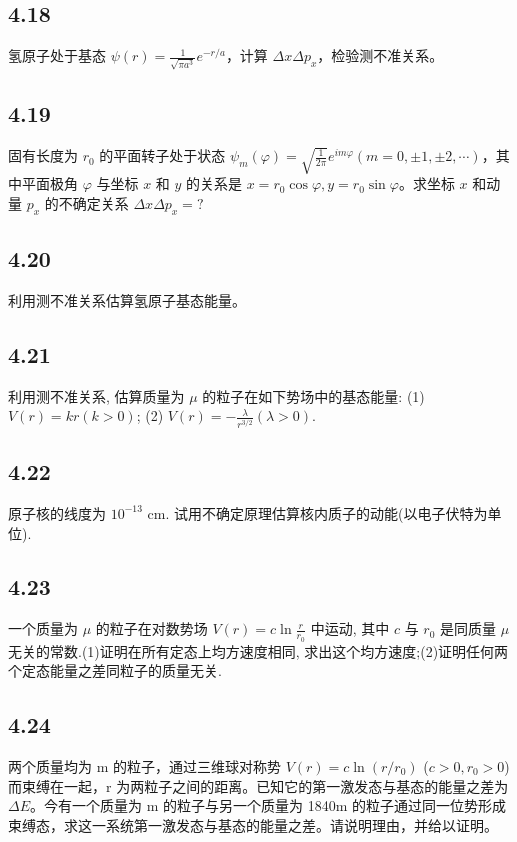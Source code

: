 \subsection{4.18}
氢原子处于基态 $\psi(r) = \frac{1}{\sqrt{\pi a^3}} e^{-r/a}$，计算 $\Delta x \Delta p_x$，检验测不准关系。

\subsection{4.19}
固有长度为 $r_0$ 的平面转子处于状态 $\psi_m(\varphi) = \sqrt{\frac{1}{2\pi}} e^{im\varphi} (m = 0, \pm 1, \pm 2, \cdots)$，其中平面极角 $\varphi$ 与坐标 $x$ 和 $y$ 的关系是 $x = r_0 \cos \varphi,  y = r_0 \sin \varphi$。求坐标 $x$ 和动量 $p_x$ 的不确定关系 $\Delta x \Delta p_x = ?$

\subsection{4.20}
利用测不准关系估算氢原子基态能量。

\subsection{4.21}
利用测不准关系, 估算质量为 $\mu$ 的粒子在如下势场中的基态能量:
(1) $V(r) = kr(k > 0)$; (2) $V(r) = -\frac{\lambda}{r^{3/2}} (\lambda > 0)$.

\subsection{4.22}
原子核的线度为 $10^{-13}$ cm. 试用不确定原理估算核内质子的动能(以电子伏特为单位).

\subsection{4.23}
一个质量为 $\mu$ 的粒子在对数势场 $V(r) = c \ln \frac{r}{r_0}$ 中运动, 其中 $c$ 与 $r_0$ 是同质量 $\mu$ 无关的常数.(1)证明在所有定态上均方速度相同, 求出这个均方速度;(2)证明任何两个定态能量之差同粒子的质量无关.

\subsection{4.24}
两个质量均为 m 的粒子，通过三维球对称势 $V(r) = c \ln (r/r_0) $ ($c > 0, r_0 > 0$) 而束缚在一起，r 为两粒子之间的距离。已知它的第一激发态与基态的能量之差为 $\Delta E$。今有一个质量为 m 的粒子与另一个质量为 1840m 的粒子通过同一位势形成束缚态，求这一系统第一激发态与基态的能量之差。请说明理由，并给以证明。

